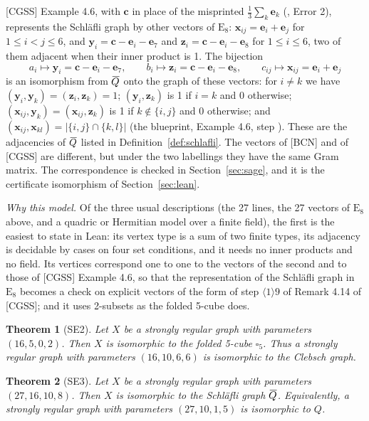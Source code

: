 \documentclass[11pt]{amsart}
\newcommand\comp[1]{{\mkern2mu\overline{\mkern-2mu#1}}}
\newtheorem{theorem}{Theorem}[section]
\theoremstyle{definition}
\DeclareRobustCommand{\ml}[1]{\ifmmode\text{\normalfont\small\ttfamily\detokenize{#1}}\else{\normalfont\small\nolinkurl{#1}}\fi}
\begin{document}
[CGSS] Example 4.6, with $\mathbf c$ in place of the misprinted $\frac13\sum_k\mathbf e_k$
(\ml{cgss/errata.md}, Error 2), represents the Schl\"afli graph by other vectors of $\mathrm
E_8$: $\mathbf x_{ij}=\mathbf e_i+\mathbf e_j$ for $1\le i<j\le6$, and $\mathbf y_i=\mathbf
c-\mathbf e_i-\mathbf e_7$ and $\mathbf z_i=\mathbf c-\mathbf e_i-\mathbf e_8$ for $1\le i\le6$,
two of them adjacent when their inner product is 1. The bijection
\[
a_i\mapsto\mathbf y_i=\mathbf c-\mathbf e_i-\mathbf e_7,\qquad
b_i\mapsto\mathbf z_i=\mathbf c-\mathbf e_i-\mathbf e_8,\qquad
c_{ij}\mapsto\mathbf x_{ij}=\mathbf e_i+\mathbf e_j
\]
is an isomorphism from $\comp Q$ onto the graph of these vectors: for $i\ne k$ we have $(\mathbf
y_i,\mathbf y_k)=(\mathbf z_i,\mathbf z_k)=1$; $(\mathbf y_i,\mathbf z_k)$ is 1 if $i=k$ and 0
otherwise; $(\mathbf x_{ij},\mathbf y_k)=(\mathbf x_{ij},\mathbf z_k)$ is 1 if $k\notin\{i,j\}$
and 0 otherwise; and $(\mathbf x_{ij},\mathbf x_{kl})=\lvert\{i,j\}\cap\{k,l\}\rvert$ (the
blueprint, Example 4.6, step \ml{s46ip}). These are the adjacencies of $\comp Q$ listed in
Definition~\ref{def:schlafli}. The vectors of [BCN] and of [CGSS] are different, but under the
two labellings they have the same Gram matrix. The correspondence is checked in
Section~\ref{sec:sage}, and it is the certificate isomorphism of Section~\ref{sec:lean}.

\emph{Why this model.} Of the three usual descriptions (the 27 lines, the 27 vectors of
$\mathrm E_8$ above, and a quadric or Hermitian model over a finite field), the first is the
easiest to state in Lean: its vertex type is a sum of two finite types, its adjacency is
decidable by cases on four set conditions, and it needs no inner products and no field.
Its vertices correspond one to one to the vectors of the second and to those of [CGSS]
Example 4.6, so that the representation of the Schl\"afli graph in $\mathrm E_8$ becomes a check
on explicit vectors of the form of step $\langle1\rangle9$ of Remark 4.14 of [CGSS]; and it uses
2-subsets as the folded 5-cube does.

\begin{theorem}[SE2]\label{thm:se2}
Let $X$ be a strongly regular graph with parameters $(16,5,0,2)$. Then $X$ is isomorphic to the
folded 5-cube $\square_5$. Thus a strongly regular graph with parameters $(16,10,6,6)$ is
isomorphic to the Clebsch graph.
\end{theorem}

\begin{theorem}[SE3]\label{thm:se3}
Let $X$ be a strongly regular graph with parameters $(27,16,10,8)$. Then $X$ is isomorphic to the
Schl\"afli graph $\comp Q$. Equivalently, a strongly regular graph with parameters $(27,10,1,5)$
is isomorphic to $Q$.
\end{theorem}
\end{document}
